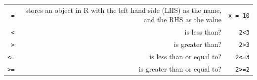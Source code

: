\documentclass[]{book}
\begin{document}
\begin{longtable}[]{@{}rrr@{}}
\begin{minipage}[t]{0.30\columnwidth}
\texttt{=}\strut
\end{minipage} & \begin{minipage}[t]{0.30\columnwidth}\raggedleft
stores an object in R with the left hand side (LHS) as the name, and the RHS as the value\strut
\end{minipage} & \begin{minipage}[t]{0.30\columnwidth}\raggedleft
\texttt{x\ =\ 10}\strut
\end{minipage}\tabularnewline
\begin{minipage}[t]{0.30\columnwidth}\raggedleft
\texttt{\textless{}}\strut
\end{minipage} & \begin{minipage}[t]{0.30\columnwidth}\raggedleft
is less than?\strut
\end{minipage} & \begin{minipage}[t]{0.30\columnwidth}\raggedleft
\texttt{2\textless{}3}\strut
\end{minipage}\tabularnewline
\begin{minipage}[t]{0.30\columnwidth}\raggedleft
\texttt{\textgreater{}}\strut
\end{minipage} & \begin{minipage}[t]{0.30\columnwidth}\raggedleft
is greater than?\strut
\end{minipage} & \begin{minipage}[t]{0.30\columnwidth}\raggedleft
\texttt{2\textgreater{}3}\strut
\end{minipage}\tabularnewline
\begin{minipage}[t]{0.30\columnwidth}\raggedleft
\texttt{\textless{}=}\strut
\end{minipage} & \begin{minipage}[t]{0.30\columnwidth}\raggedleft
is less than or equal to?\strut
\end{minipage} & \begin{minipage}[t]{0.30\columnwidth}\raggedleft
\texttt{2\textless{}=3}\strut
\end{minipage}\tabularnewline
\begin{minipage}[t]{0.30\columnwidth}\raggedleft
\texttt{\textgreater{}=}\strut
\end{minipage} & \begin{minipage}[t]{0.30\columnwidth}\raggedleft
is greater than or equal to?\strut
\end{minipage} & \begin{minipage}[t]{0.30\columnwidth}\raggedleft
\texttt{2\textgreater{}=2}\strut
\end{minipage}\tabularnewline

\end{longtable}
\end{document}
